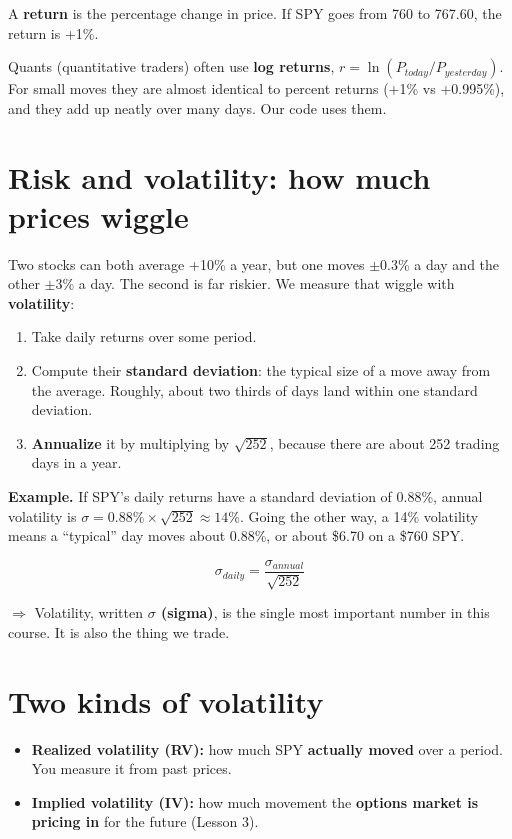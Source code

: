 \documentclass{article}
\begin{document}
A \textbf{return} is the percentage change in price. If SPY goes from 760 to 767.60, the return is +1\%.

Quants (quantitative traders) often use \textbf{log returns}, $r = \ln(P_{today}/P_{yesterday})$. For small moves they are almost identical to percent returns (+1\% vs +0.995\%), and they add up neatly over many days. Our code uses them.

\section{Risk and volatility: how much prices wiggle}

Two stocks can both average +10\% a year, but one moves \ensuremath{\pm}0.3\% a day and the other \ensuremath{\pm}3\% a day. The second is far riskier. We measure that wiggle with \textbf{volatility}:

\begin{enumerate}

\item Take daily returns over some period.

\item Compute their \textbf{standard deviation}: the typical size of a move away from the average. Roughly, about two thirds of days land within one standard deviation.

\item \textbf{Annualize} it by multiplying by $\sqrt{252}$, because there are about 252 trading days in a year.

\end{enumerate}

\textbf{Example.} If SPY's daily returns have a standard deviation of 0.88\%, annual volatility is $\sigma = 0.88\% \times \sqrt{252} \approx 14\%$. Going the other way, a 14\% volatility means a ``typical'' day moves about 0.88\%, or about \$6.70 on a \$760 SPY.

\[\sigma_{daily} = \frac{\sigma_{annual}}{\sqrt{252}}\]

\textbf{$\Rightarrow$} Volatility, written \textbf{\ensuremath{\sigma} (sigma)}, is the single most important number in this course. It is also the thing we trade.

\section{Two kinds of volatility}

\begin{itemize}

\item \textbf{Realized volatility (RV):} how much SPY \textbf{actually moved} over a period. You measure it from past prices.

\item \textbf{Implied volatility (IV):} how much movement the \textbf{options market is pricing in} for the future (Lesson 3).

\end{itemize}
\end{document}
